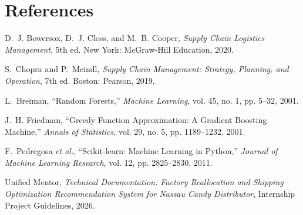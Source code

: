\documentclass[12pt]{article}
\begin{document}
\newpage

\section*{References}

\begin{enumerate}[label={[\arabic*]}]
    \item D.~J. Bowersox, D.~J. Closs, and M.~B. Cooper, \textit{Supply Chain Logistics Management}, 5th ed. New York: McGraw-Hill Education, 2020.
    \item S.~Chopra and P.~Meindl, \textit{Supply Chain Management: Strategy, Planning, and Operation}, 7th ed. Boston: Pearson, 2019.
    \item L.~Breiman, ``Random Forests,'' \textit{Machine Learning}, vol. 45, no. 1, pp. 5--32, 2001.
    \item J.~H. Friedman, ``Greedy Function Approximation: A Gradient Boosting Machine,'' \textit{Annals of Statistics}, vol. 29, no. 5, pp. 1189--1232, 2001.
    \item F.~Pedregosa \textit{et al.}, ``Scikit-learn: Machine Learning in Python,'' \textit{Journal of Machine Learning Research}, vol. 12, pp. 2825--2830, 2011.
    \item Unified Mentor, \textit{Technical Documentation: Factory Reallocation and Shipping Optimization Recommendation System for Nassau Candy Distributor}, Internship Project Guidelines, 2026.
\end{enumerate}
\end{document}
